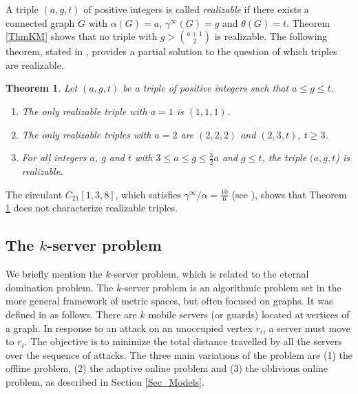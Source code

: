 \documentclass[12pt]{article}%
\newtheorem{theorem}{Theorem}[section]
\begin{document}
A triple $(a,g,t)$ of positive integers is called \emph{realizable }if there
exists a connected graph $G$ with $\alpha(G)=a$, $\gamma^{\infty}(G)=g$ and
$\theta(G)=t$. Theorem \ref{ThmKM} shows that no triple with $g>\binom{a+1}%
{2}$ is realizable. The following theorem, stated in \cite{KM2}, provides a
partial solution to the question of which triples are realizable.

\begin{theorem}
\label{ThmTriples}Let $(a,g,t)$ be a triple of positive integers such that
$a\leq g\leq t$.

\begin{enumerate}
\item[\emph{(a)}] The only realizable triple with $a=1$ is $(1,1,1)$.

\item[\emph{(b)}] \emph{\cite{BCG2, GHH, klos1}}\hspace{0.1in}The only
realizable triples with $a=2$ are $(2,2,2)$ and $(2,3,t)$, $t\geq3$.

\item[\emph{(c)}] \emph{\cite{BCG2, klos1, KM2}\hspace{0.1in}}For all integers
$a$, $g$ and $t$ with $3\leq a\leq g\leq\frac{3}{2}a$ and $g\leq t$, the
triple $(a,g,t$) is realizable.
\end{enumerate}
\end{theorem}

The circulant $C_{21}[1,3,8]$, which satisfies $\gamma^{\infty}/\alpha
=\frac{10}{6}$ (see \cite{GHH}), shows that Theorem \ref{ThmTriples} does not
characterize realizable triples.

\subsection{The $k$-server problem}

\label{Sec_k-server}We briefly mention the $k$-server problem, which is
related to the eternal domination problem. The $k$-server problem is an
algorithmic problem set in the more general framework of metric spaces, but
often focused on graphs. It was defined in \cite{mms} as follows. There are
$k$ mobile servers (or guards) located at vertices of a graph. In response to
an attack on an unoccupied vertex $r_{i}$, a server must move to $r_{i}$. The
objective is to minimize the total distance travelled by all the servers over
the sequence of attacks. The three main variations of the problem are (1) the
offline problem, (2) the adaptive online problem and (3) the oblivious online
problem, as described in Section \ref{Sec_Models}.
\end{document}
